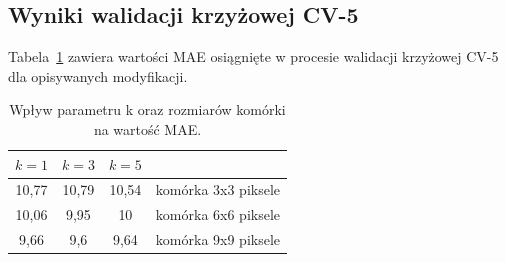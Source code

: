 \documentclass[a4paper,twoside,12pt]{book}
\begin{document}
    \subsection*{Wyniki walidacji krzyżowej CV-5}
    Tabela~\ref{tab.hogknncv} zawiera wartości MAE osiągnięte w procesie walidacji krzyżowej CV-5 dla opisywanych
    modyfikacji.
    \begin{table}[t!]
        \centering
        \caption{Wpływ parametru k oraz rozmiarów komórki na wartość MAE.}
        \begin{tabular}{|c|c|c|c|}
            \hline
            $k=1$ & $k=3$ & $k=5$  &                     \\ \hline
            10,77 & 10,79 & 10,54 & komórka 3x3 piksele \\ \hline
            10,06 & 9,95 & 10 & komórka 6x6 piksele \\ \hline
            9,66 & 9,6 & 9,64 & komórka 9x9 piksele \\ \hline
        \end{tabular}
        \label{tab.hogknncv}
    \end{table}
\end{document}
